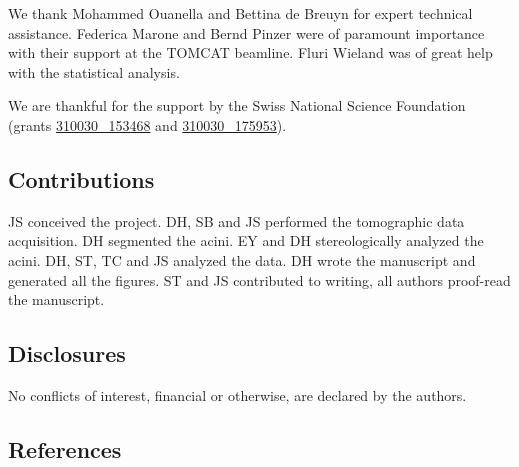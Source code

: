 \documentclass[
  american,
]{article}
\begin{document}
We thank Mohammed Ouanella and Bettina de Breuyn for expert technical assistance.
Federica Marone and Bernd Pinzer were of paramount importance with their support at the TOMCAT beamline.
Fluri Wieland was of great help with the statistical analysis.

We are thankful for the support by the Swiss National Science Foundation (grants \href{http://p3.snf.ch/project-153468}{310030\_153468} and \href{http://p3.snf.ch/project-175953}{310030\_175953}).

\hypertarget{contributions}{%
\subsection{Contributions}\label{contributions}}

JS conceived the project.
DH, SB and JS performed the tomographic data acquisition.
DH segmented the acini.
EY and DH stereologically analyzed the acini.
DH, ST, TC and JS analyzed the data.
DH wrote the manuscript and generated all the figures.
ST and JS contributed to writing, all authors proof-read the manuscript.

\hypertarget{disclosures}{%
\subsection{Disclosures}\label{disclosures}}

No conﬂicts of interest, financial or otherwise, are declared by the authors.

\hypertarget{references}{%
\subsection{References}\label{references}}
\end{document}
